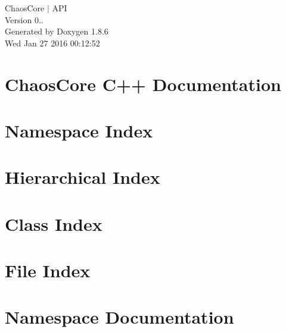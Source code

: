 \documentclass[twoside]{book}
\newcommand{\clearemptydoublepage}{%
  \newpage{\pagestyle{empty}\cleardoublepage}%
}
\begin{document}
\hypersetup{pageanchor=false}
\begin{titlepage}
\vspace*{7cm}
\begin{center}%
{\Large Chaos\-Core $\vert$ A\-P\-I \\[1ex]\large Version 0.. }\\
\vspace*{1cm}
{\large Generated by Doxygen 1.8.6}\\
\vspace*{0.5cm}
{\small Wed Jan 27 2016 00:12:52}\\
\end{center}
\end{titlepage}
\clearemptydoublepage
\tableofcontents
\clearemptydoublepage
{}
\hypersetup{pageanchor=true}

\chapter{Chaos\-Core C++ Documentation}
\label{index}\hypertarget{index}{}
\chapter{Namespace Index}

\chapter{Hierarchical Index}

\chapter{Class Index}

\chapter{File Index}

\chapter{Namespace Documentation}













\end{document}
